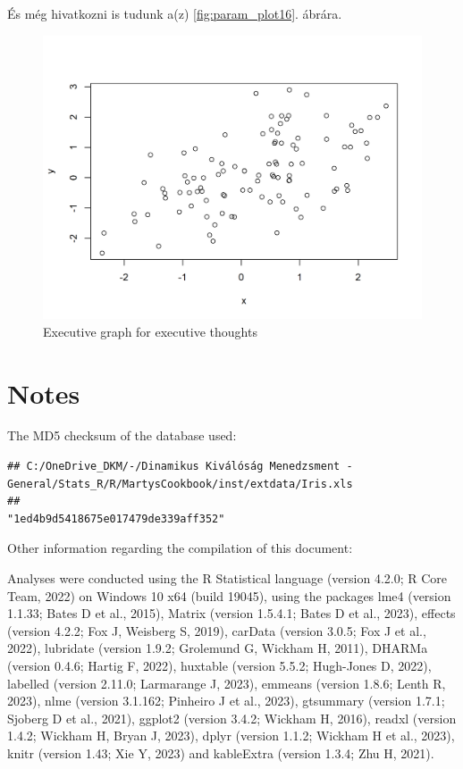 \documentclass[
]{article}
\begin{document}
És még hivatkozni is tudunk a(z) \ref{fig:param_plot16}. ábrára.

\begin{figure}[H]

{\centering \includegraphics[width=0.9\linewidth]{cookbook_files/figure-latex/referenced_chunk-1} 

}

\caption{Executive graph for executive thoughts}\label{fig:referenced_chunk}
\end{figure}

\hypertarget{notes}{%
\section{Notes}\label{notes}}

The MD5 checksum of the database used:

\begin{verbatim}
## C:/OneDrive_DKM/-/Dinamikus Kiválóság Menedzsment - General/Stats_R/R/MartysCookbook/inst/extdata/Iris.xls 
##                                                                         "1ed4b9d5418675e017479de339aff352"
\end{verbatim}

Other information regarding the compilation of this document:

Analyses were conducted using the R Statistical language (version 4.2.0;
R Core Team, 2022) on Windows 10 x64 (build 19045), using the packages
lme4 (version 1.1.33; Bates D et al., 2015), Matrix (version 1.5.4.1;
Bates D et al., 2023), effects (version 4.2.2; Fox J, Weisberg S, 2019),
carData (version 3.0.5; Fox J et al., 2022), lubridate (version 1.9.2;
Grolemund G, Wickham H, 2011), DHARMa (version 0.4.6; Hartig F, 2022),
huxtable (version 5.5.2; Hugh-Jones D, 2022), labelled (version 2.11.0;
Larmarange J, 2023), emmeans (version 1.8.6; Lenth R, 2023), nlme
(version 3.1.162; Pinheiro J et al., 2023), gtsummary (version 1.7.1;
Sjoberg D et al., 2021), ggplot2 (version 3.4.2; Wickham H, 2016),
readxl (version 1.4.2; Wickham H, Bryan J, 2023), dplyr (version 1.1.2;
Wickham H et al., 2023), knitr (version 1.43; Xie Y, 2023) and
kableExtra (version 1.3.4; Zhu H, 2021).
\end{document}
